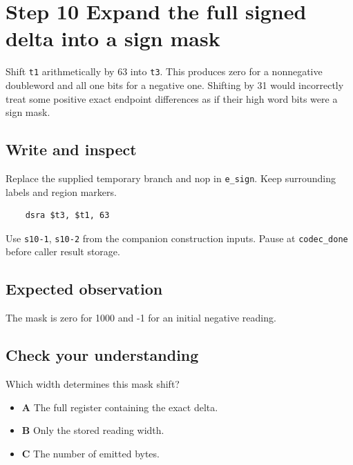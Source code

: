 \section{Step 10 Expand the full signed delta into a sign mask}\label{delta-s10}

Shift \texttt{t1} arithmetically by 63 into \texttt{t3}. This produces zero for a nonnegative doubleword and all one bits for a negative one. Shifting by 31 would incorrectly treat some positive exact endpoint differences as if their high word bits were a sign mask.

\subsection{Write and inspect}
Replace the supplied temporary branch and nop in \texttt{e\_sign}. Keep surrounding labels and region markers.

\begin{verbatim}
    dsra $t3, $t1, 63
\end{verbatim}
Use \texttt{s10-1}, \texttt{s10-2} from the companion construction inputs. Pause at \texttt{codec\_done} before caller result storage.

\subsection{Expected observation}
The mask is zero for 1000 and -1 for an initial negative reading.

\subsection{Check your understanding}
Which width determines this mask shift?

\begin{itemize}
\item \textbf{A} The full register containing the exact delta.
\item \textbf{B} Only the stored reading width.
\item \textbf{C} The number of emitted bytes.
\end{itemize}
